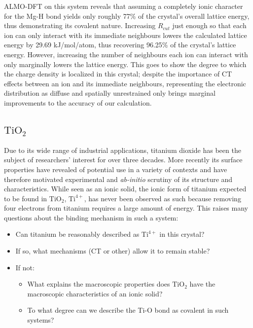 \documentclass[aps,prb,twocolumn,amsmath,amssymb,superscriptaddress,longbibliography]{revtex4-1}
\begin{document}
ALMO-DFT on this system reveals that assuming a completely ionic character for the Mg-H bond yields only roughly 77\% of the crystal's overall lattice energy, thus demonstrating its covalent nature. Increasing $R_{cut}$ just enough so that each ion can only interact with its immediate neighbours lowers the calculated lattice energy by 29.69 kJ/mol/atom, thus recovering 96.25\% of the crystal's lattice energy. However, increasing the number of neighbours each ion can interact with only marginally lowers the lattice energy. This goes to show the degree to which the charge density is localized in this crystal; despite the importance of CT effects between an ion and its immediate neighbours, representing the electronic distribution as diffuse and spatially unrestrained only brings marginal improvements to the accuracy of our calculation.




\subsection*{$\text{TiO}_{2}$}


Due to its wide range of industrial applications, titanium dioxide has been the subject of researchers' interest for over three decades. More recently its surface properties have revealed of potential use in a variety of contexts and have therefore motivated experimental and \emph{ab-initio} scrutiny of its structure and characteristics. While seen as an ionic solid, the ionic form of titanium expected to be found in $\text{TiO}_{2}$, $\text{Ti}^{4+}$, has never been observed as such because removing four electrons from titanium requires a large amount of energy. This raises many questions about the binding mechanism in such a system:
\begin{itemize}
\item Can titanium be reasonably described as $\text{Ti}^{4+}$ in this crystal?
\item If so, what mechanisms (CT or other) allow it to remain stable?
\item If not:
	\begin{itemize}
	\item What explains the macroscopic properties does $\text{TiO}_{2}$ have the macroscopic characteristics of an ionic solid?
	\item To what degree can we describe the Ti-O bond as covalent in such systems?
	\end{itemize}
\end{itemize}
\end{document}
